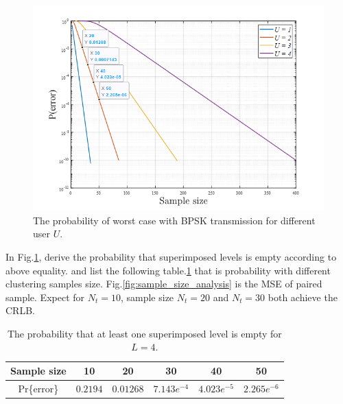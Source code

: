 \begin{figure}[H]
 \centering
 \includegraphics[width=15cm]{fig/sample_size_error_probability_analysis.png}
 \caption{The probability of worst case with BPSK transmission for different user $U$.}
 \label{fig:sample_size_error_rate}
\end{figure}

In Fig.\ref{fig:sample_size_error_rate}, derive the probability that superimposed levels is empty according to above equality. and list the following table.\ref{table:sample_size} that is probability with different clustering samples size. Fig.\ref{fig:sample_size_analysis} is the MSE of paired sample. Expect for $N_t=10$, sample size $N_t=20$ and $N_t=30$ both achieve the CRLB. 

\begin{table}[b!]
\caption{The probability that at least one superimposed level is empty for $L=4$.}
\begin{center}
 \begin{tabular}{ |c|c|c|c|c|c| }
 \hline
 Sample size & 10 & 20 & 30 & 40 & 50 \\
 \hline
 Pr\{error\}  & $0.2194$ & $0.01268$ & $7.143e^{-4}$ & $4.023e^{-5}$ & $2.265e^{-6}$ \\
 \hline
\end{tabular}
\end{center}
\label{table:sample_size}
\end{table}

